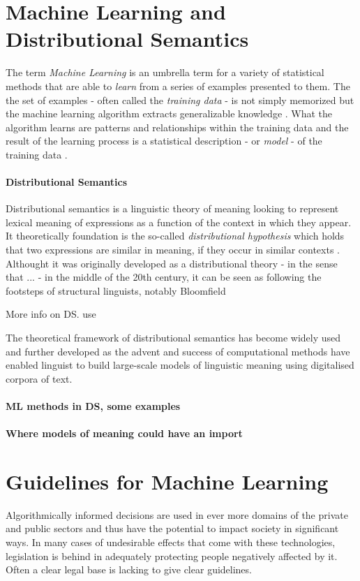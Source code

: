 \documentclass{article}
\begin{document}
\section{Machine Learning and Distributional Semantics}\hypertarget{sec3}{ }
The term \emph{Machine Learning} is an umbrella term for a variety of statistical methods that are able to \emph{learn} from a series of examples presented to them. The the set of examples - often called the \emph{training data} - is not simply memorized but the machine learning algorithm extracts generalizable knowledge \cite{domingos2012few}.
 What the algorithm learns are patterns and relationships within the training data and the result of the learning process is a statistical description - or \emph{model} - of the training data \cite{fayyad2001digital}.
 
 \paragraph{Distributional Semantics}
Distributional semantics is a linguistic theory of meaning looking to represent lexical meaning of expressions as a function of the context in which they appear. It theoretically foundation is the so-called \emph{distributional hypothesis} which holds that two expressions are similar in meaning, if they occur in similar contexts \cite{harris1954distributional}.
Althought it was originally developed as a distributional theory - in the sense that ... - in the middle of the 20th century, it can be seen as following the footsteps of structural linguists, notably Bloomfield \cite{bloomfield}

More info on DS. use \cite{boleda2016formal}

The theoretical framework of distributional semantics has become widely used and further developed as the advent and success of computational methods have enabled linguist to build large-scale models of linguistic meaning using digitalised corpora of text. 
 
\paragraph{ML methods in DS, some examples}

\paragraph{Where models of meaning could have an import}
 
\section{Guidelines for Machine Learning}\hypertarget{sec2}{}
Algorithmically informed decisions are used in ever more domains of the private and public sectors and thus have the potential to impact society in significant ways. In many cases of undesirable effects that come with these technologies, legislation is behind in adequately protecting people negatively affected by it. Often a clear legal base is lacking to give clear guidelines.
\end{document}
